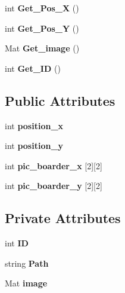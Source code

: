 \begin{DoxyCompactItemize}
int {\bfseries Get\+\_\+\+Pos\+\_\+X} ()
\item 
\mbox{\label{class_mywebcam_1_1_picture_a36a246b073234d5509657be9a090f5b9}} 
int {\bfseries Get\+\_\+\+Pos\+\_\+Y} ()
\item 
\mbox{\label{class_mywebcam_1_1_picture_a5755d09d5b285ed1364357c63e9d9e48}} 
Mat {\bfseries Get\+\_\+image} ()
\item 
\mbox{\label{class_mywebcam_1_1_picture_a4d5e4fa53f011a11031e9770ad5316cc}} 
int {\bfseries Get\+\_\+\+ID} ()
\end{DoxyCompactItemize}
\subsection*{Public Attributes}
\begin{DoxyCompactItemize}
\item 
\mbox{\label{class_mywebcam_1_1_picture_a2e97e5da67e220f31d2177979dd749d8}} 
int {\bfseries position\+\_\+x}
\item 
\mbox{\label{class_mywebcam_1_1_picture_adc8d44ac25ed9239dc3c6610070d1165}} 
int {\bfseries position\+\_\+y}
\item 
\mbox{\label{class_mywebcam_1_1_picture_ab20f6968fbfeed2b9b74c2ce86dead1a}} 
int {\bfseries pic\+\_\+boarder\+\_\+x} \mbox{[}2\mbox{]}\mbox{[}2\mbox{]}
\item 
\mbox{\label{class_mywebcam_1_1_picture_abc3327db10390fb2b35b13a176d37551}} 
int {\bfseries pic\+\_\+boarder\+\_\+y} \mbox{[}2\mbox{]}\mbox{[}2\mbox{]}
\end{DoxyCompactItemize}
\subsection*{Private Attributes}
\begin{DoxyCompactItemize}
\item 
\mbox{\label{class_mywebcam_1_1_picture_a53beaa98108e6d283a114badc0fe66a0}} 
int {\bfseries ID}
\item 
\mbox{\label{class_mywebcam_1_1_picture_afd45a1ecf3e4ab4d38c991347d09c034}} 
string {\bfseries Path}
\item 
\mbox{\label{class_mywebcam_1_1_picture_a748a025b642b2a5ba2a1b474fd77d024}} 
Mat {\bfseries image}
\end{DoxyCompactItemize}
